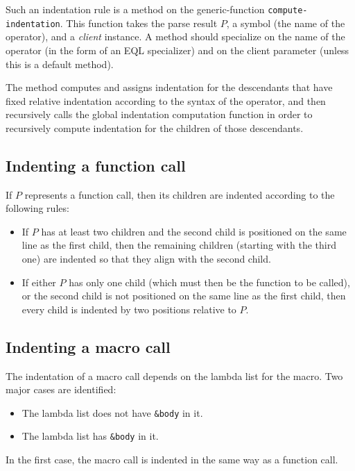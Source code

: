 Such an indentation rule is a method on the generic-function
\texttt{compute-indentation}.  This function takes the parse result
$P$, a symbol (the name of the operator), and a \emph{client}
instance.  A method should specialize on the name of the operator (in
the form of an EQL specializer) and on the client parameter (unless
this is a default method).

The method computes and assigns indentation for the descendants that
have fixed relative indentation according to the syntax of the
operator, and then recursively calls the global indentation
computation function in order to recursively compute indentation for
the children of those descendants.

\subsection{Indenting a function call}

If $P$ represents a function call, then its children are indented
according to the following rules:

\begin{itemize}
\item If $P$ has at least two children and the second child is
  positioned on the same line as the first child, then the remaining
  children (starting with the third one) are indented so that they
  align with the second child.
\item If either $P$ has only one child (which must then be the
  function to be called), or the second child is not positioned on the
  same line as the first child, then every child is indented by two
  positions relative to $P$.
\end{itemize}

\subsection{Indenting a macro call}

The indentation of a macro call depends on the lambda list for the
macro.  Two major cases are identified:

\begin{itemize}
\item The lambda list does not have \texttt{&body} in it.
\item The lambda list has \texttt{&body} in it.
\end{itemize}

In the first case, the macro call is indented in the same way as a
function call.

